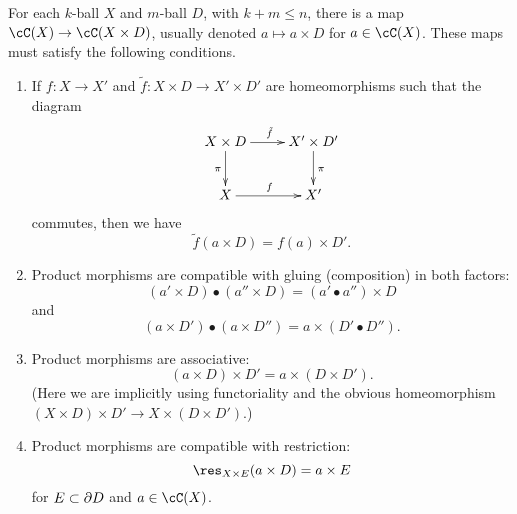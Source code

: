 \begin{axiom}
For each $k$-ball $X$ and $m$-ball $D$, with $k+m \le n$, there is a map $\cC(X)\to \cC(X\times D)$, 
usually denoted $a\mapsto a\times D$ for $a\in \cC(X)$.
These maps must satisfy the following conditions.
\begin{enumerate}
\item
If $f:X\to X'$ and $\tilde{f}:X\times D \to X'\times D'$ are homeomorphisms such that the diagram
\[ \xymatrix{
	X\times D \ar[r]^{\tilde{f}} \ar[d]_{\pi} & X'\times D' \ar[d]^{\pi} \\
	X \ar[r]^{f} & X'
} \]
commutes, then we have 
\[
	\tilde{f}(a\times D) = f(a)\times D' .
\]
\item
Product morphisms are compatible with gluing (composition) in both factors:
\[
	(a'\times D)\bullet(a''\times D) = (a'\bullet a'')\times D
\]
and
\[
	(a\times D')\bullet(a\times D'') = a\times (D'\bullet D'') .
\]
\item
Product morphisms are associative:
\[
	(a\times D)\times D' = a\times (D\times D') .
\]
(Here we are implicitly using functoriality and the obvious homeomorphism
$(X\times D)\times D' \to X\times(D\times D')$.)
\item
Product morphisms are compatible with restriction:
\[
	\res_{X\times E}(a\times D) = a\times E
\]
for $E\subset \partial D$ and $a\in \cC(X)$.
\end{enumerate}
\end{axiom}

